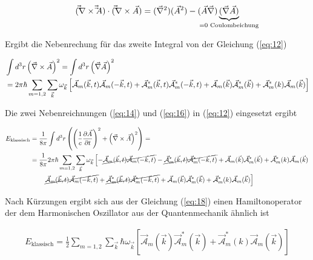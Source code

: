 \begin{align}
  \label{eq:17}
  (\vec \vec \nabla\times\vec \vec A)\cdot(\vec \vec \nabla\times\vec A) = (\vec\nabla^2)(\vec A^2) - (\vec A\vec \nabla)\underbr{(\vec \nabla\vec A)}_{=0\text{ Coulombeichung}}
\end{align}

Ergibt die Nebenrechung für das zweite Integral von der Gleichung (\ref{eq:12})

\begin{align}
  \label{eq:16}
   &\int d^3r  \left(\vec \nabla\times\vec A\right)^2 = \int d^3r  \left( \vec \nabla \vec A \right)^2 \notag\\
&=  2\pi\hbar \sum_{m=1,2} \sum_{\vec k} \omega_{\vec k}  \left[ \vec{\mathcal A}_m (\vec k,t) \vec{\mathcal A}_{m} (- \vec k,t)   
+  \vec{\mathcal A}^*_m (\vec k,t) \vec{\mathcal A}^*_{m} (- \vec k,t) 
+ \vec{\mathcal A}_{m} (\vec k)  \vec{\mathcal A}^*_{m} (\vec k)  
+ \vec{\mathcal A}^*_m (k) \vec{\mathcal A}_{m} (\vec k)  \right] \notag\\
\end{align}


Die zwei Nebenreichnungen (\ref{eq:14}) und (\ref{eq:16}) in (\ref{eq:12}) eingesetzt ergibt

\begin{align}
  \label{eq:18}
   E_{\text{klassisch}} &= \frac{1}{8\pi} \int d^3r \left( \left( \frac{1}{c} \pdiff{\vec A}_t \right)^2 + \left(\vec \nabla\times\vec A\right)^2 \right) = \notag\\
&=  \frac{1}{8\pi} 2\pi\hbar \sum_{m=1,2} \sum_{\vec k} \omega_{\vec k}  
\left[- \cancel{\vec{\mathcal A}_m (\vec k,t) \vec{\mathcal A}_{m} (- \vec k,t)}  
 - \cancel{\vec{\mathcal A}^*_m (\vec k,t) \vec{\mathcal A}^*_{m} (- \vec k,t)}  
 + \vec{\mathcal A}_{m} (\vec k)  \vec{\mathcal A}^*_{m} (\vec k) 
 + \vec{\mathcal A}^*_m (k) \vec{\mathcal A}_{m} (\vec k)  \right. \notag\\
&\qquad\left. \cancel{  \vec{\mathcal A}_m (\vec k,t) \vec{\mathcal A}_{m} (- \vec k,t)}  
+ \cancel{  \vec{\mathcal A}^*_m (\vec k,t) \vec{\mathcal A}^*_{m} (- \vec k,t)}
+ \vec{\mathcal A}_{m} (\vec k)  \vec{\mathcal A}^*_{m} (\vec k)  
+ \vec{\mathcal A}^*_m (k) \vec{\mathcal A}_{m} (\vec k)  \right]
\end{align}

Nach Kürzungen ergibt sich aus der Gleichung (\ref{eq:18}) einen Hamiltonoperator der dem Harmonischen Oszillator aus der Quantenmechanik ähnlich ist

\begin{align}
  \label{eq:19}
   E_{\text{klassisch}} = \frac{1}{2} \sum_{m=1,2} \sum_{\vec k} \hbar \omega_{\vec k} \left[ 
 \vec{\mathcal A}_{m} (\vec k)  \vec{\mathcal A}^*_{m} (\vec k)  
+ \vec{\mathcal A}^*_m (k) \vec{\mathcal A}_{m} (\vec k)
\right]
\end{align}

